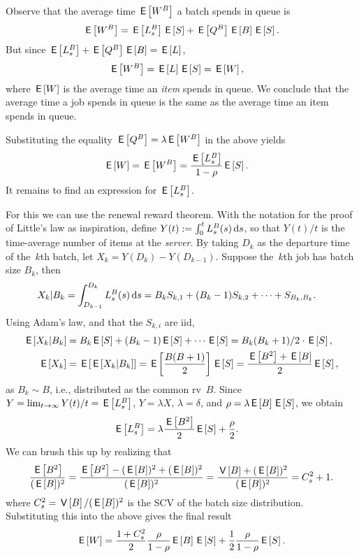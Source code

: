 \documentclass[stochastic-or.tex]{subfiles}
\begin{document}
Observe that the average time $\E{\W^{B}}$ a batch spends in queue is
\begin{equation*}
  \E{\W^B} =  \E{\Ls^B}\E S + \E{\QQ^B} \E B \E S.
\end{equation*}
But since $\E{\Ls^B} + \E{\QQ^B} \E B = \E \L$,
\begin{align*}
  \E{\W^B} &=  \E\L \E S = \E{\W},
\end{align*}
where $\E W$ is the average time an \emph{item} spends in queue.
We conclude that the average time a job spends in queue is the same as the average time an item spends in queue.

Substituting the equality  $\E{\QQ^B} = \lambda \E{\W^B}$  in the above yields
\begin{align}\label{eq:96}
\E W =  \E{\W^B} &= \frac{\E{\Ls^B}}{1-\rho}\E{S}.
\end{align}
It remains to find an expression for $\E{\Ls^B}$.

For this we can use the renewal reward theorem.
With the notation for the proof of Little's law as inspiration, define $Y(t) := \int_0^t \Ls^B(s) \d s$, so that $Y(t)/t$  is the time-average number of items at the \emph{server}.
By taking $D_k$ as the departure time of the~$k$th batch, let $X_k = Y(D_k)-Y(D_{k-1})$.
Suppose the~$k$th job has batch size $B_{k}$, then
  \begin{align*}
    X_k|B_{k} &= \int_{D_{k-1}}^{D_k} \Ls^B(s) \d s
    = B_{k} S_{k,1} + (B_{k}-1)S_{k,2} + \cdots + S_{B_{k}, B_{k}}.
  \end{align*}
Using Adam's law, and that the $S_{k,i}$ are iid,
\begin{align*}
    \E{X_k | B_k} &= B_{k}\E S + (B_{k}-1)\E S + \cdots \E S = B_{k}(B_{k}+1)/2 \cdot \E S, \\
    \E{X_k} & = \E{\E{X_k| B_k}} = \E{\frac{B(B+1)}2} \E S =    \frac{\E{B^2}+\E B}2 \E S,
\end{align*}
as $B_{k}\sim B$, i.e., distributed as the common rv~$B$.
Since $Y=\lim_{t\to\infty} Y(t)/t = \E{\Ls^{B}}$, $Y=\lambda X$, $\lambda = \delta$, and $\rho=\lambda \E B \E S$, we obtain
\begin{align}\label{eq:17}
  \E{\Ls^B} &= \lambda \frac{\E{B^2}}2\E S + \frac\rho 2. %
\end{align}
We can brush this up by realizing that
\begin{align*}
\frac{\E{B^2}}{(\E{B})^2}
  =\frac{\E{B^2}-(\E B)^2 + (\E B)^2}{(\E{B})^2}
= \frac{\V B + (\E B)^2}{(\E B)^2}= C_s^2+1.
\end{align*}
where $C_s^2 = \V B/ (\E B)^{2}$ is the SCV of the batch size distribution.  Substituting this into the above gives the final result
\begin{equation}\label{eq:43}
\E{\W} =
\frac{1+C_s^2}2 \frac{\rho}{1-\rho} \E B \E S + \frac12\frac\rho{1-\rho} \E S.
\end{equation}
\end{document}
